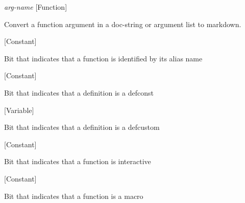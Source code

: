 \vspace{1em}
\noindent
{}
\usebox{\funcname}\emph{arg-name}
 \hfill [Function]

\begin{doc-string}
Convert a function argument in a doc-string or argument list to markdown.
\end{doc-string}

\vspace{1em}
\noindent
{}
\usebox{\funcname}
 \hfill [Constant]

\begin{doc-string}
Bit that indicates that a function is identified by its alias name
\end{doc-string}

\vspace{1em}
\noindent
{}
\usebox{\funcname}
 \hfill [Constant]

\begin{doc-string}
Bit that indicates that a definition is a defconst
\end{doc-string}

\vspace{1em}
\noindent
{}
\usebox{\funcname}
 \hfill [Variable]

\begin{doc-string}
Bit that indicates that a definition is a defcustom
\end{doc-string}

\vspace{1em}
\noindent
{}
\usebox{\funcname}
 \hfill [Constant]

\begin{doc-string}
Bit that indicates that a function is interactive
\end{doc-string}

\vspace{1em}
\noindent
{}
\usebox{\funcname}
 \hfill [Constant]

\begin{doc-string}
Bit that indicates that a function is a macro
\end{doc-string}

